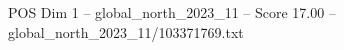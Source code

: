 \begin{textsample}{POS Dim 1 – global\_north\_2023\_11 – Score 17.00 – global\_north\_2023\_11/103371769.txt}
\end{textsample}
